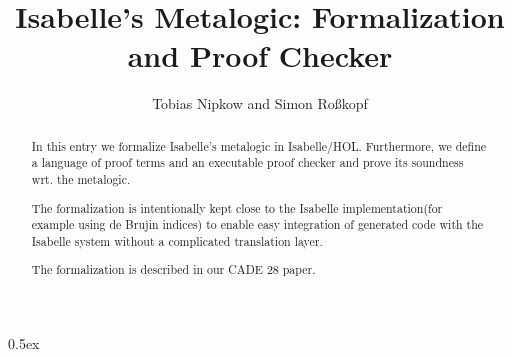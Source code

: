 \documentclass[11pt,a4paper]{article}
\begin{document}
\title{Isabelle's Metalogic: Formalization and Proof Checker}
\author{Tobias Nipkow and Simon Roßkopf}
\maketitle

\begin{abstract}
In this entry we formalize Isabelle's metalogic in Isabelle/HOL. Furthermore, we define a language of proof terms and an executable proof checker and prove its soundness wrt. the metalogic. 
	
The formalization is intentionally kept close to the Isabelle implementation(for example using de Brujin indices) to enable easy integration of generated code with the Isabelle system without a complicated translation layer.
	
The formalization is described in our CADE 28 paper\cite{cade28}.
\end{abstract}

\tableofcontents

\parindent 0pt\parskip 0.5ex



\nocite{BerghoferN-TPHOLs00}
\nocite{Paulson-JAR-89}
\nocite{tphol/Wenzel97}
\nocite{implementation}



\end{document}
